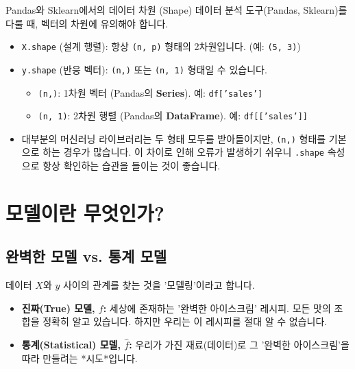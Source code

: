 \documentclass[11pt,a4paper]{book}
\theoremstyle{definition}
\begin{document}
\begin{cautionbox}{Pandas와 Sklearn에서의 데이터 차원 (Shape)}
데이터 분석 도구(Pandas, Sklearn)를 다룰 때, 벡터의 차원에 유의해야 합니다.

\begin{itemize}
    \item \texttt{X.shape} (설계 행렬): 항상 \texttt{(n, p)} 형태의 2차원입니다. (예: \texttt{(5, 3)})
    \item \texttt{y.shape} (반응 벡터): \texttt{(n,)} 또는 \texttt{(n, 1)} 형태일 수 있습니다.
        \begin{itemize}
            \item \texttt{(n,)}: 1차원 벡터 (Pandas의 \textbf{Series}). 예: \texttt{df['sales']}
            \item \texttt{(n, 1)}: 2차원 행렬 (Pandas의 \textbf{DataFrame}). 예: \texttt{df[['sales']]}
        \end{itemize}
    \item 대부분의 머신러닝 라이브러리는 두 형태 모두를 받아들이지만, \texttt{(n,)} 형태를 기본으로 하는 경우가 많습니다. 이 차이로 인해 오류가 발생하기 쉬우니 \texttt{.shape} 속성으로 항상 확인하는 습관을 들이는 것이 좋습니다.
\end{itemize}
\end{cautionbox}


\section{모델이란 무엇인가?}

\subsection{완벽한 모델 vs. 통계 모델}

데이터 $X$와 $y$ 사이의 관계를 찾는 것을 '모델링'이라고 합니다.

\begin{analogybox}[title={아이스크림 비유}]
\begin{itemize}
    \item \textbf{진짜(True) 모델, $f$:} 세상에 존재하는 '완벽한 아이스크림' 레시피. 모든 맛의 조합을 정확히 알고 있습니다. 하지만 우리는 이 레시피를 절대 알 수 없습니다.
    \item \textbf{통계(Statistical) 모델, $\hat{f}$:} 우리가 가진 재료(데이터)로 그 '완벽한 아이스크림'을 따라 만들려는 *시도*입니다.
\end{itemize}
\end{analogybox}
\end{document}
